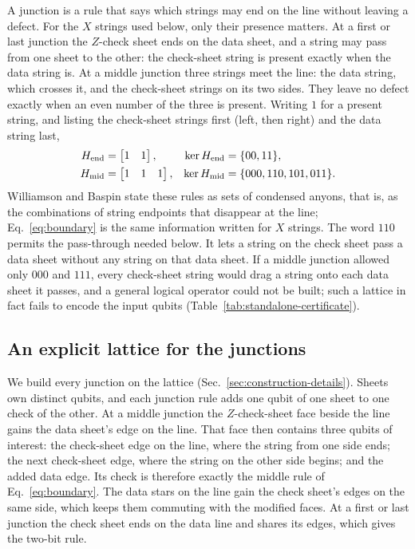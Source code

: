 A junction is a rule that says which strings may end on the line without
leaving a defect.  For the $X$ strings used below, only their presence
matters.  At a first or last junction the $Z$-check sheet ends on the data
sheet, and a string may pass from one sheet to the other: the check-sheet
string is present exactly when the data string is.  At a middle junction
three strings meet the line: the data string, which crosses it, and the
check-sheet strings on its two sides.  They leave no defect exactly when an
even number of the three is present.  Writing $1$ for a present string, and
listing the check-sheet strings first (left, then right) and the data string
last,
\begin{align}
 H_{\rm end}&=\begin{bmatrix}1&1\end{bmatrix}, &
 \ker H_{\rm end}&=\{00,11\},\nonumber\\
 H_{\rm mid}&=\begin{bmatrix}1&1&1\end{bmatrix}, &
 \ker H_{\rm mid}&=\{000,110,101,011\}.
 \label{eq:boundary}
\end{align}
Williamson and Baspin state these rules as sets of condensed anyons, that is,
as the combinations of string endpoints that disappear at the line;
Eq.~\eqref{eq:boundary} is the same information written for $X$ strings.  The word $110$ permits the pass-through needed below.  It lets a string on the check sheet pass a data sheet without
any string on that data sheet.  If a middle junction allowed only $000$ and
$111$, every check-sheet string would drag a string onto each data sheet it
passes, and a general logical operator could not be built; such a lattice in
fact fails to encode the input qubits (Table~\ref{tab:standalone-certificate}).

\subsection{An explicit lattice for the junctions}
We build every junction on the lattice (Sec.~\ref{sec:construction-details}).  Sheets own distinct qubits, and
each junction rule adds one qubit of one sheet to one check of the other.  At
a middle junction the $Z$-check-sheet face beside the line gains the data
sheet's edge on the line.  That face then contains three qubits of interest:
the check-sheet edge on the line, where the string from one side ends; the
next check-sheet edge, where the string on the other side begins; and the
added data edge.  Its check is therefore exactly the middle rule of
Eq.~\eqref{eq:boundary}.  The data stars on the line gain the check sheet's
edges on the same side, which keeps them commuting with the modified faces.
At a first or last junction the check sheet ends on the data line and shares
its edges, which gives the two-bit rule.

